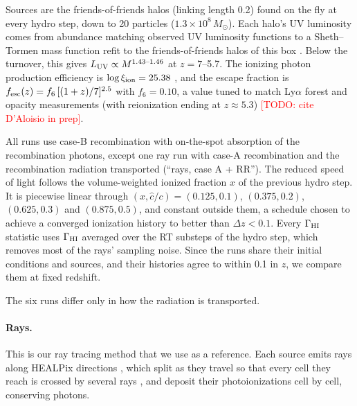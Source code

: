 \documentclass[11pt]{article}
\newcommand{\todo}[1]{\textcolor{red}{[TODO: #1]}}
\newcommand{\chat}{\hat{c}}
\begin{document}
Sources are the friends-of-friends halos (linking length 0.2) found on the
fly at every hydro step, down to 20 particles
($1.3\times10^8\,M_\odot$). Each halo's UV luminosity comes from abundance
matching observed UV luminosity functions to a Sheth--Tormen mass function
refit to the friends-of-friends halos of this box
\citep{sheth99,bouwens21,bouwens22,donnan24,atek26}. Below the turnover,
this gives $L_{\rm UV}\propto M^{1.43\textrm{--}1.46}$ at $z=7$--5.7. The
ionizing photon production efficiency is
$\log\xi_{\rm ion}=25.38$ \citep{pahl25}, and the escape fraction is
$f_{\rm esc}(z)=f_6\,[(1+z)/7]^{2.5}$ with $f_6=0.10$, a value tuned to match Ly$\alpha$ forest and opacity measurements (with reionization ending at $z\approx 5.3$) \todo{cite D'Aloisio in prep}.

All runs use case-B recombination with on-the-spot absorption of the
recombination photons, except one ray run with case-A recombination and
the recombination radiation transported (``rays, case A + RR''). %
The reduced speed of light follows the volume-weighted ionized fraction
$x$ of the previous hydro step. It is piecewise linear through
$(x,\chat/c)=(0.125,0.1)$, $(0.375,0.2)$, $(0.625,0.3)$ and $(0.875,0.5)$,
and constant outside them, a schedule chosen to achieve a converged ionization history to better than $\Delta z<0.1$.  Every $\Gamma_{\rm HI}$ statistic uses
$\Gamma_{\rm HI}$ averaged over the RT substeps of the hydro step, which
removes most of the rays' sampling noise. Since the runs share their
initial conditions and sources, and their histories agree to within 0.1
in $z$, we compare them at fixed redshift.


The six runs differ only in how the radiation is transported.

\paragraph{Rays.} This is our ray tracing method that we use as a reference. Each source emits rays along HEALPix
directions \citep{gorski05}, which split as they travel so that every cell
they reach is crossed by several rays \citep{abel02,trac07}, and deposit
their photoionizations cell by cell, conserving photons. %
\end{document}
